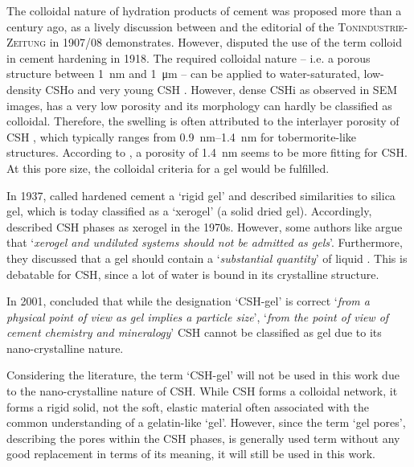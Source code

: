 The colloidal nature of hydration products of cement was proposed more than a century ago, as a lively discussion between \textcite{michaelis.1908} and the editorial of the \textsc{Tonindustrie-Zeitung} in 1907/08 demonstrates.
However, \textcite{chatelier.1918} disputed the use of the term colloid in cement hardening in 1918.
The required colloidal nature – i.e. a porous structure between \qty{1}{\nano\meter} and \qty{1}{\micro\meter} – can be applied to water-saturated, low-density \ac{CSHo} and very young \ac{CSH} \cite{sowoidnich.2023}.
However, dense \ac{CSHi} as observed in \ac{SEM} images, has a very low porosity and its morphology can hardly be classified as colloidal.
Therefore, the swelling is often attributed to the interlayer porosity of \ac{CSH} \cite{jennings.2008}, which typically ranges from \qtyrange{0.9}{1.4}{\nano\meter} for tobermorite-like structures.
According to \textcite{duque-redondo.2022}, a porosity of \qty{1.4}{\nano\meter} seems to be more fitting for \ac{CSH}.
At this pore size, the colloidal criteria for a gel would be fulfilled.

In 1937, \textcite{lea.1937} called hardened cement a `rigid gel' and described similarities to silica gel, which is today classified as a `xerogel' (a solid dried gel).
Accordingly, \textcite{wittmann.1976,wittmann.1977} described \ac{CSH} phases as xerogel in the 1970s.
However, some authors like \textcite{almdal.1993} argue that `\textit{xerogel and undiluted systems should not be admitted as gels}'.
Furthermore, they discussed that a gel should contain a `\textit{substantial quantity}' of liquid \cite{almdal.1993}.
This is debatable for \ac{CSH}, since a lot of water is bound in its crystalline structure.

In 2001, \textcite{stark.2001} concluded that while the designation `\ac{CSH}-gel' is correct `\textit{from a physical point of view as gel implies a particle size}', `\textit{from the point of view of cement chemistry and mineralogy}' \ac{CSH} cannot be classified as gel due to its nano-crystalline nature.

Considering the literature, the term `\ac{CSH}-gel' will not be used in this work due to the nano-crystalline nature of \ac{CSH}.
While \ac{CSH} forms a colloidal network, it forms a rigid solid, not the soft, elastic material often associated with the common understanding of a gelatin-like `gel'.
However, since the term `gel pores', describing the pores within the \ac{CSH} phases, is generally used term without any good replacement in terms of its meaning, it will still be used in this work.

